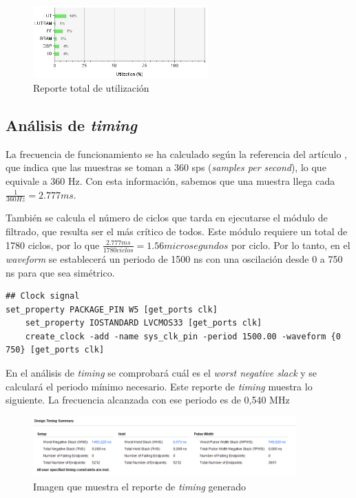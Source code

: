 \begin{figure}[h]
	\centering
	\includegraphics[width=0.6\textwidth]{./Images/img_res_experimentales/utilization3.png}
	\caption{Reporte total de utilización}
	\label{fig:utilization3}
\end{figure}


\subsection{Análisis de \textit{timing} }

La frecuencia de funcionamiento se ha calculado según la referencia del artículo \cite{desai2021low}, que indica que las muestras se toman a 360 sps (\textit{samples per second}), lo que equivale a 360 Hz. Con esta información, sabemos que una muestra llega cada \( \frac{1}{360 Hz} = 2.777 ms\).

También se calcula el número de ciclos que tarda en ejecutarse el módulo de filtrado, que resulta ser el más crítico de todos. Este módulo requiere un total de 1780 ciclos, por lo que \( \frac{2.777  ms}{1780 ciclos} = 1.56  microsegundos \) por ciclo. Por lo tanto, en el \textit{waveform} se establecerá un periodo de 1500 ns con una oscilación desde 0 a 750 ns para que sea simétrico.


\lstset{language=VHDL, breaklines=true, basicstyle=\footnotesize}
\begin{lstlisting}[frame=single]
## Clock signal
set_property PACKAGE_PIN W5 [get_ports clk]							
	set_property IOSTANDARD LVCMOS33 [get_ports clk]
	create_clock -add -name sys_clk_pin -period 1500.00 -waveform {0 750} [get_ports clk]
\end{lstlisting}

	En el análisis de  \textit{timing}  se comprobará cuál es el \textit{worst negative slack} y se calculará el periodo mínimo necesario. Este reporte de  \textit{timing}  muestra lo siguiente. La frecuencia alcanzada con ese periodo es de 0,540 MHz

	\begin{figure}[h!]
		\centering
		\includegraphics[width=0.9\textwidth]{./Images/img_res_experimentales/reportetiming.png}
		\caption{Imagen que muestra el reporte de  \textit{timing}  generado}
		\label{fig:reporteTiming}
	\end{figure} 

